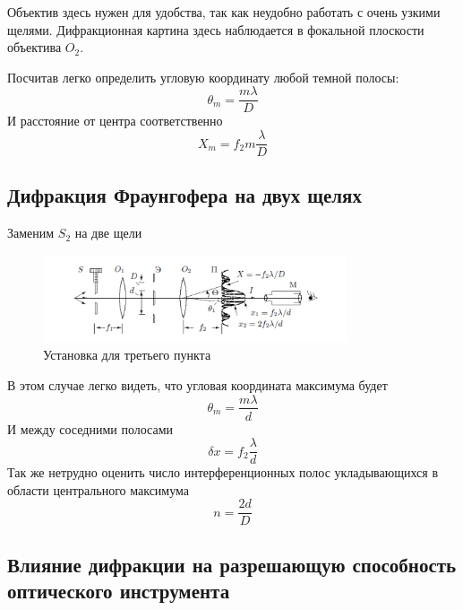 Объектив здесь нужен для удобства, так как неудобно работать с очень узкими щелями. Дифракционная картина здесь наблюдается в фокальной плоскости объектива $O_2$. 

Посчитав легко определить угловую координату любой темной полосы:
\begin{equation}
\theta_m = \frac{m \lambda}{D}
\end{equation}
И расстояние от центра соответственно 
\begin{equation}
X_m = f_2m\frac{\lambda}{D}
\end{equation}

\subsection*{Дифракция Фраунгофера на двух щелях}

Заменим $S_2$ на две щели 

\begin{figure}[h]
\begin{center}
\includegraphics[width = 0.8\textwidth]{5.png}
\caption{Установка для третьего пункта}
\end{center}
\end{figure}

В этом случае легко видеть, что угловая координата максимума будет 
\begin{equation}
\theta_m = \frac{m \lambda}{d}
\end{equation}
И между соседними полосами 
\begin{equation}
\delta x = f_2 \frac{\lambda}{d}
\end{equation}
Так же нетрудно оценить число интерференционных полос укладывающихся в области центрального максимума 
\begin{equation}
n = \frac{2d}{D}
\end{equation}

\newpage

\subsection*{Влияние дифракции на разрешающую способность оптического инструмента}


